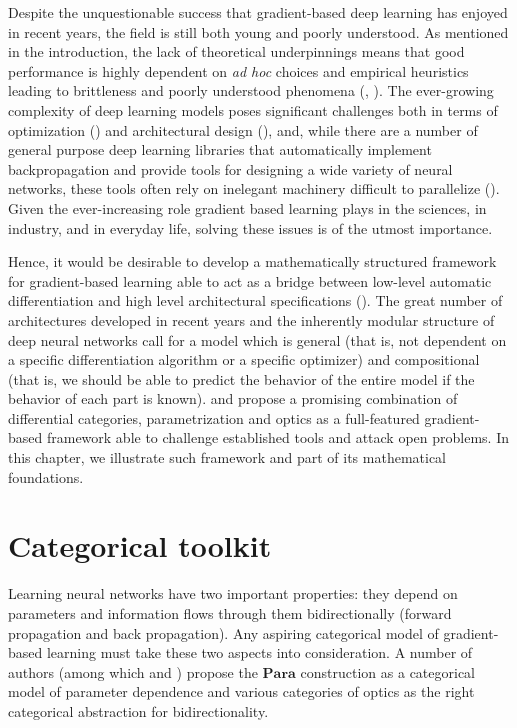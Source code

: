 \documentclass[11pt,a4paper,openright,twoside]{report}
\theoremstyle{plain}
\theoremstyle{definition}
\begin{document}
Despite the unquestionable success that gradient-based deep learning has enjoyed in recent years, the field is still both young and poorly understood. As mentioned in the introduction, the lack of theoretical underpinnings means that good performance is highly dependent on \textit{ad hoc} choices and empirical heuristics leading to brittleness and poorly understood phenomena (\cite{shiebler2021category}, \cite{gavranovic2024fundamental}). The ever-growing complexity of deep learning models poses significant challenges both in terms of optimization (\cite{elliott2018simple}) and architectural design (\cite{gavranovicposition}), and, while there are a number of general purpose deep learning libraries that automatically implement backpropagation and provide tools for designing a wide variety of neural networks, these tools often rely on inelegant machinery difficult to parallelize (\cite{elliott2018simple}). Given the ever-increasing role gradient based learning plays in the sciences, in industry, and in everyday life, solving these issues is of the utmost importance. 

Hence, it would be desirable to develop a mathematically structured framework for gradient-based learning able to act as a bridge between low-level automatic differentiation and high level architectural specifications (\cite{gavranovic2024fundamental}). The great number of architectures developed in recent years and the inherently modular structure of deep neural networks call for a model which is general (that is, not dependent on a specific differentiation algorithm or a specific optimizer) and compositional (that is, we should be able to predict the behavior of the entire model if the behavior of each part is known). \cite{cruttwell2022categorical} and \cite{gavranovic2024fundamental} propose a promising combination of differential categories, parametrization and optics as a full-featured gradient-based framework able to challenge established tools and attack open problems. In this chapter, we illustrate such framework  and part of its mathematical foundations. 



\section{Categorical toolkit}

Learning neural networks have two important properties: they depend on parameters and information flows through them bidirectionally (forward propagation and back propagation). Any aspiring categorical model of gradient-based learning must take these two aspects into consideration. A number of authors (among which \cite{cruttwell2022categorical} and \cite{gavranovic2024fundamental}) propose the $\mathbf{Para}$ construction as a categorical model of parameter dependence and various categories of optics as the right categorical abstraction for bidirectionality.
\end{document}
